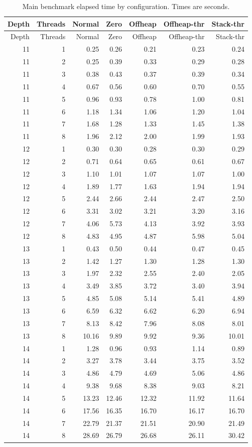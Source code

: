 \documentclass[11pt,a4paper]{article}
\begin{document}
\begin{longtable}{rrrrrrr}
\caption{Main benchmark elapsed time by configuration. Times are seconds.}
\label{tab:detail}\\
\toprule
Depth & Threads & Normal & Zero & Offheap & Offheap-thr & Stack-thr \\
\midrule
\endfirsthead
\toprule
Depth & Threads & Normal & Zero & Offheap & Offheap-thr & Stack-thr \\
\midrule
\endhead
11 & 1 & 0.25 & 0.26 & 0.21 & 0.23 & 0.24 \\
11 & 2 & 0.25 & 0.39 & 0.33 & 0.29 & 0.28 \\
11 & 3 & 0.38 & 0.43 & 0.37 & 0.39 & 0.34 \\
11 & 4 & 0.67 & 0.56 & 0.60 & 0.70 & 0.55 \\
11 & 5 & 0.96 & 0.93 & 0.78 & 1.00 & 0.81 \\
11 & 6 & 1.18 & 1.34 & 1.06 & 1.20 & 1.04 \\
11 & 7 & 1.68 & 1.28 & 1.33 & 1.45 & 1.38 \\
11 & 8 & 1.96 & 2.12 & 2.00 & 1.99 & 1.93 \\
12 & 1 & 0.30 & 0.30 & 0.28 & 0.30 & 0.29 \\
12 & 2 & 0.71 & 0.64 & 0.65 & 0.61 & 0.67 \\
12 & 3 & 1.10 & 1.01 & 1.07 & 1.07 & 1.00 \\
12 & 4 & 1.89 & 1.77 & 1.63 & 1.94 & 1.94 \\
12 & 5 & 2.44 & 2.66 & 2.44 & 2.47 & 2.50 \\
12 & 6 & 3.31 & 3.02 & 3.21 & 3.20 & 3.16 \\
12 & 7 & 4.06 & 5.73 & 4.13 & 3.92 & 3.93 \\
12 & 8 & 4.83 & 4.95 & 4.87 & 5.98 & 5.04 \\
13 & 1 & 0.43 & 0.50 & 0.44 & 0.47 & 0.45 \\
13 & 2 & 1.42 & 1.27 & 1.30 & 1.28 & 1.30 \\
13 & 3 & 1.97 & 2.32 & 2.55 & 2.40 & 2.05 \\
13 & 4 & 3.49 & 3.85 & 3.72 & 3.40 & 3.94 \\
13 & 5 & 4.85 & 5.08 & 5.14 & 5.41 & 4.89 \\
13 & 6 & 6.59 & 6.32 & 6.62 & 6.20 & 6.94 \\
13 & 7 & 8.13 & 8.42 & 7.96 & 8.08 & 8.01 \\
13 & 8 & 10.16 & 9.89 & 9.92 & 9.36 & 10.01 \\
14 & 1 & 1.28 & 0.96 & 0.93 & 1.14 & 0.89 \\
14 & 2 & 3.27 & 3.78 & 3.44 & 3.75 & 3.52 \\
14 & 3 & 4.86 & 4.79 & 4.69 & 5.06 & 4.86 \\
14 & 4 & 9.38 & 9.68 & 8.38 & 9.03 & 8.21 \\
14 & 5 & 13.23 & 12.46 & 12.32 & 11.92 & 11.64 \\
14 & 6 & 17.56 & 16.35 & 16.70 & 16.17 & 16.70 \\
14 & 7 & 22.79 & 21.37 & 21.51 & 20.90 & 21.49 \\
14 & 8 & 28.69 & 26.79 & 26.68 & 26.11 & 30.42 \\
\bottomrule
\end{longtable}
\end{document}
